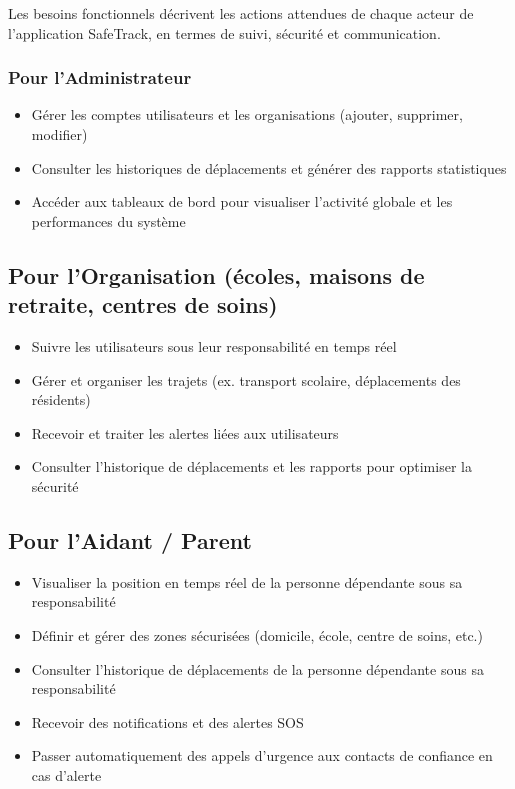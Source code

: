 Les besoins fonctionnels décrivent les actions attendues de chaque acteur de l'application SafeTrack, en termes de suivi, sécurité et communication.

\subsubsection*{Pour l'Administrateur}
\begin{itemize}
    \item Gérer les comptes utilisateurs et les organisations (ajouter, supprimer, modifier)
    \item Consulter les historiques de déplacements et générer des rapports statistiques
    \item Accéder aux tableaux de bord pour visualiser l'activité globale et les performances du système
\end{itemize}


\subsection*{Pour l'Organisation (écoles, maisons de retraite, centres de soins)}
\begin{itemize}
    \item Suivre les utilisateurs sous leur responsabilité en temps réel
    \item Gérer et organiser les trajets (ex. transport scolaire, déplacements des résidents)
    \item Recevoir et traiter les alertes liées aux utilisateurs
    \item Consulter l'historique de déplacements et les rapports pour optimiser la sécurité
\end{itemize}

\subsection*{Pour l'Aidant / Parent}
\begin{itemize}
    \item Visualiser la position en temps réel de la personne dépendante sous sa responsabilité
    \item Définir et gérer des zones sécurisées (domicile, école, centre de soins, etc.)
    \item Consulter l'historique de déplacements de la personne dépendante sous sa responsabilité
    \item Recevoir des notifications et des alertes SOS
    \item Passer automatiquement des appels d'urgence aux contacts de confiance en cas d'alerte
\end{itemize}

